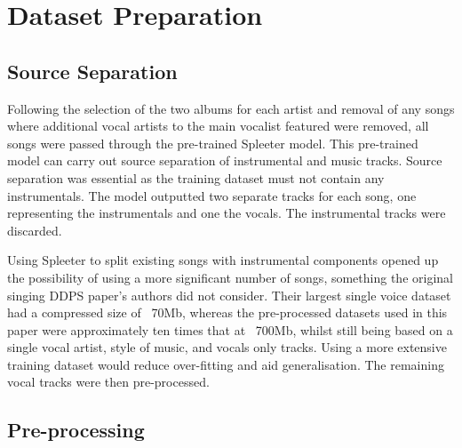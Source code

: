 \section{Dataset Preparation}

\subsection{Source Separation}

Following the selection of the two albums for each artist and removal of any songs where additional vocal artists to the main vocalist featured were removed, all songs were passed through the pre-trained Spleeter model\cite{SpleeterPip}\cite{SpleeterPip}. This pre-trained model can carry out source separation of instrumental and music tracks. Source separation was essential as the training dataset must not contain any instrumentals. The model outputted two separate tracks for each song, one representing the instrumentals and one the vocals. The instrumental tracks were discarded.

Using Spleeter to split existing songs with instrumental components opened up the possibility of using a more significant number of songs, something the original singing DDPS paper's authors did not consider. Their largest single voice dataset had a compressed size of ~70Mb, whereas the pre-processed datasets used in this paper were approximately ten times that at ~700Mb, whilst still being based on a single vocal artist, style of music, and vocals only tracks. Using a more extensive training dataset would reduce over-fitting and aid generalisation. The remaining vocal tracks were then pre-processed.

\subsection{Pre-processing}

